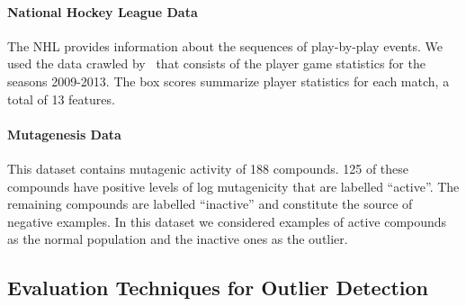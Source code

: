 {				%
				\paragraph{National Hockey League Data} 
				The NHL provides information about the sequences of play-by-play events. We used the data crawled by~\cite{schulte2014aggregating} that consists of the player game statistics for the seasons 2009-2013. The box scores summarize player statistics for each match, a total of 13 features. \\
				
				\paragraph{Mutagenesis Data}
				This dataset contains mutagenic activity of 188 compounds. 125 of these compounds have positive levels of log mutagenicity that are labelled ``active''.  The remaining compounds are labelled ``inactive'' and constitute the source of negative examples. In this dataset we considered examples of active compounds as the normal population and the inactive ones as the outlier. 
				
				\subsection{Evaluation Techniques for Outlier Detection}
				
}
